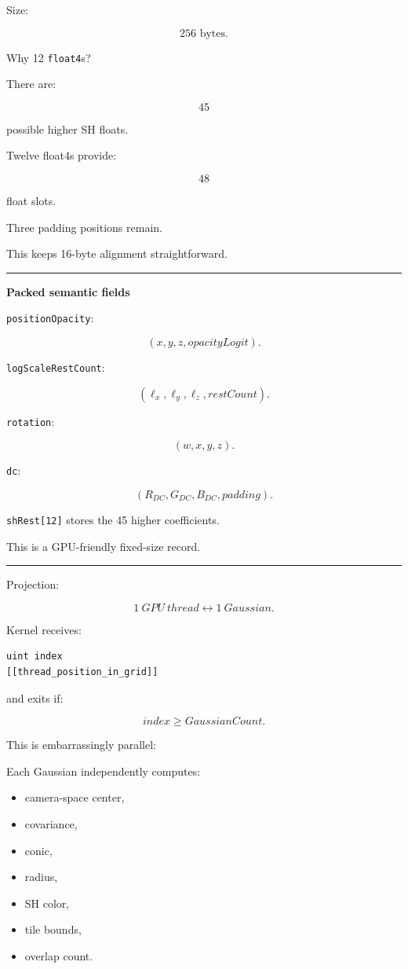 Size:

\[
\boxed{256\text{ bytes}.}
\]

Why 12 \texttt{float4}s?

There are:

\[
45
\]

possible higher SH floats.

Twelve float4s provide:

\[
48
\]

float slots.

Three padding positions remain.

This keeps 16-byte alignment straightforward.

\begin{center}\rule{0.5\linewidth}{0.5pt}\end{center}

\textbf{Packed semantic fields}

\texttt{positionOpacity}:

\[
(x,y,z,opacityLogit).
\]

\texttt{logScaleRestCount}:

\[
(\ell_x,\ell_y,\ell_z,restCount).
\]

\texttt{rotation}:

\[
(w,x,y,z).
\]

\texttt{dc}:

\[
(R_{DC},G_{DC},B_{DC},padding).
\]

\texttt{shRest{[}12{]}} stores the 45 higher coefficients.

This is a GPU-friendly fixed-size record.

\begin{center}\rule{0.5\linewidth}{0.5pt}\end{center}

Projection:

\[
\boxed{
1\ GPU\ thread
\leftrightarrow
1\ Gaussian.
}
\]

Kernel receives:

\begin{verbatim}
uint index
[[thread_position_in_grid]]
\end{verbatim}

and exits if:

\[
index\ge GaussianCount.
\]

This is embarrassingly parallel:

Each Gaussian independently computes:

\begin{itemize}
\tightlist
\item
  camera-space center,
\item
  covariance,
\item
  conic,
\item
  radius,
\item
  SH color,
\item
  tile bounds,
\item
  overlap count.
\end{itemize}

